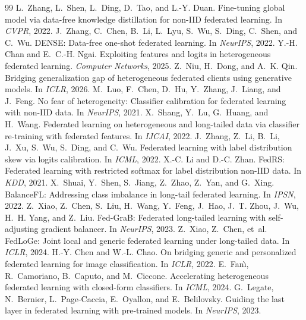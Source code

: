 \documentclass[10pt]{article}
\theoremstyle{plain}
\theoremstyle{definition}
\begin{document}
\begin{thebibliography}{99}
 L.~Zhang, L.~Shen, L.~Ding, D.~Tao, and L.-Y. Duan. Fine-tuning global model via data-free knowledge distillation for non-IID federated learning. In \emph{CVPR}, 2022.
 J.~Zhang, C.~Chen, B.~Li, L.~Lyu, S.~Wu, S.~Ding, C.~Shen, and C.~Wu. DENSE: Data-free one-shot federated learning. In \emph{NeurIPS}, 2022.
 Y.-H. Chan and E.~C.-H. Ngai. Exploiting features and logits in heterogeneous federated learning. \emph{Computer Networks}, 2025.
 Z.~Niu, H.~Dong, and A.~K. Qin. Bridging generalization gap of heterogeneous federated clients using generative models. In \emph{ICLR}, 2026.
 M.~Luo, F.~Chen, D.~Hu, Y.~Zhang, J.~Liang, and J.~Feng. No fear of heterogeneity: Classifier calibration for federated learning with non-IID data. In \emph{NeurIPS}, 2021.
 X.~Shang, Y.~Lu, G.~Huang, and H.~Wang. Federated learning on heterogeneous and long-tailed data via classifier re-training with federated features. In \emph{IJCAI}, 2022.
 J.~Zhang, Z.~Li, B.~Li, J.~Xu, S.~Wu, S.~Ding, and C.~Wu. Federated learning with label distribution skew via logits calibration. In \emph{ICML}, 2022.
 X.-C. Li and D.-C. Zhan. FedRS: Federated learning with restricted softmax for label distribution non-IID data. In \emph{KDD}, 2021.
 X.~Shuai, Y.~Shen, S.~Jiang, Z.~Zhao, Z.~Yan, and G.~Xing. BalanceFL: Addressing class imbalance in long-tail federated learning. In \emph{IPSN}, 2022.
 Z.~Xiao, Z.~Chen, S.~Liu, H.~Wang, Y.~Feng, J.~Hao, J.~T. Zhou, J.~Wu, H.~H. Yang, and Z.~Liu. Fed-GraB: Federated long-tailed learning with self-adjusting gradient balancer. In \emph{NeurIPS}, 2023.
 Z.~Xiao, Z.~Chen, et~al. FedLoGe: Joint local and generic federated learning under long-tailed data. In \emph{ICLR}, 2024.
 H.-Y. Chen and W.-L. Chao. On bridging generic and personalized federated learning for image classification. In \emph{ICLR}, 2022.
 E.~Fan{\`\i}, R.~Camoriano, B.~Caputo, and M.~Ciccone. Accelerating heterogeneous federated learning with closed-form classifiers. In \emph{ICML}, 2024.
 G.~Legate, N.~Bernier, L.~Page-Caccia, E.~Oyallon, and E.~Belilovsky. Guiding the last layer in federated learning with pre-trained models. In \emph{NeurIPS}, 2023.

\end{thebibliography}
\end{document}
